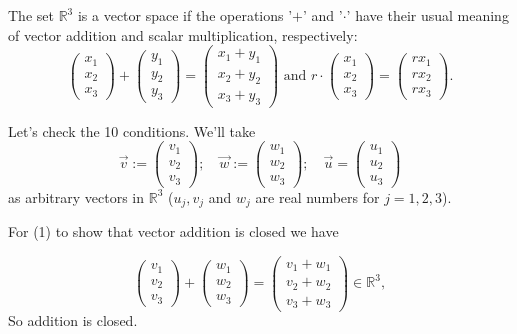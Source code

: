 \begin {example}{}
  The set $\mathbb{R}^3$ is a vector space if the operations '$ + $' and  '$\cdot$' have their usual meaning of vector addition and scalar multiplication, respectively:
\[ \left(\begin{array}{c}x_1\\x_2\\x_3\end{array}\right)+ \left(\begin{array}{c}y_1\\y_2\\y_3\end{array}\right) = \left(\begin{array}{c}x_1+y_1\\x_2+y_2\\x_3+y_3\end{array}\right) \text{ and } r\cdot \left(\begin{array}{c}x_1\\x_2\\x_3\end{array}\right) = \left(\begin{array}{c}rx_1\\rx_2\\rx_3\end{array}\right).\]

Let's check the 10 conditions. We'll take 
\[
\vec{v} := \left(\begin{array}{c}v_1\\v_2\\v_3\end{array}\right);\quad \vec{w} := \left(\begin{array}{c}w_1\\w_2\\w_3\end{array}\right); \quad
\vec{u} = \left(\begin{array}{c}u_1\\u_2\\u_3\end{array}\right)
\]
 as arbitrary vectors in $\mathbb{R}^3$ ($u_j, v_j$ and $w_j$ are real numbers for $j=1,2,3$).


For (1) to show that vector addition is closed  we have

\[ \left(\begin{array}{c}v_1\\v_2\\v_3\end{array}\right) + \left(\begin{array}{c}w_1\\w_2\\w_3\end{array}\right) = \left(\begin{array}{c}v_1+w_1\\v_2+w_2\\v_3+w_3\end{array}\right) \in\mathbb{R}^3,\]
So addition is closed.


\end{example}
